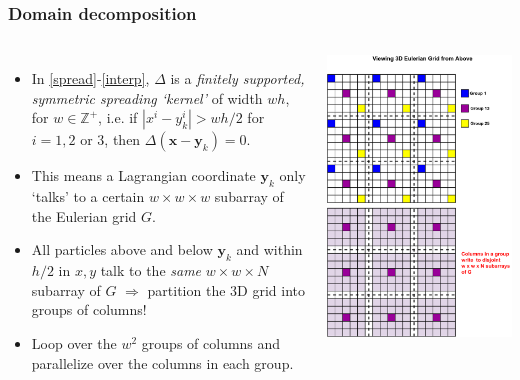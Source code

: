 \documentclass[10pt]{beamer}
\newcommand{\bs}{\boldsymbol}
\begin{document}
\begin{frame}
\frametitle{Domain decomposition}
\begin{columns}
\begin{itemize}
	\item In \eqref{spread}-\eqref{interp}, $\Delta$ is a \emph{finitely supported, symmetric spreading `kernel'} of width $wh$, for $w \in \mathbb{Z}^{+}$, i.e. if $|x^i- y_k^i| > wh/2$ for $i=1,2$ or $3$, then $\Delta(\bs x - \bs y_k)=0.$
	\item This means a Lagrangian coordinate $\bs y_k$ only `talks' to a certain $w \times w \times w$ subarray of the Eulerian grid $G$. 
	\item All particles above and below $\bs y_k$ and within $h/2$ in $x,y$ talk to the \emph{same} $w \times w \times N$ subarray of $G$ $\Rightarrow$ partition the 3D grid into groups of columns!
	\item Loop over the $w^2$ groups of columns and parallelize over the columns in each group.
\end{itemize}
\includegraphics[width=0.8\columnwidth,height=0.8\textheight]{./Figures/domain_decomp_new}
\end{columns}
\end{frame}
\end{document}
